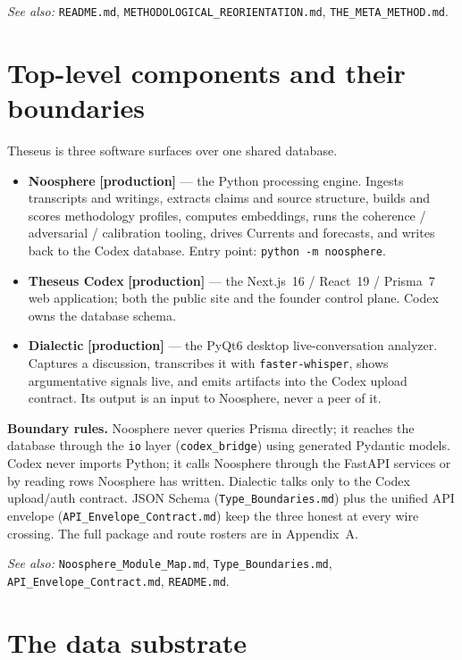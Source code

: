 \documentclass[11pt]{article}
\begin{document}
\textit{See also:} \texttt{README.md}, \texttt{METHODOLOGICAL\_REORIENTATION.md},
\texttt{THE\_META\_METHOD.md}.

\section{Top-level components and their boundaries}

Theseus is three software surfaces over one shared database.

\begin{itemize}[leftmargin=1.4em]
  \item \textbf{Noosphere} \textbf{[production]} --- the Python processing
  engine. Ingests transcripts and writings, extracts claims and source
  structure, builds and scores methodology profiles, computes embeddings, runs
  the coherence / adversarial / calibration tooling, drives Currents and
  forecasts, and writes back to the Codex database. Entry point:
  \texttt{python -m noosphere}.
  \item \textbf{Theseus Codex} \textbf{[production]} --- the Next.js~16 /
  React~19 / Prisma~7 web application; both the public site and the founder
  control plane. Codex owns the database schema.
  \item \textbf{Dialectic} \textbf{[production]} --- the PyQt6 desktop
  live-conversation analyzer. Captures a discussion, transcribes it with
  \texttt{faster-whisper}, shows argumentative signals live, and emits
  artifacts into the Codex upload contract. Its output is an input to
  Noosphere, never a peer of it.
\end{itemize}

\textbf{Boundary rules.} Noosphere never queries Prisma directly; it reaches
the database through the \texttt{io} layer (\texttt{codex\_bridge}) using
generated Pydantic models. Codex never imports Python; it calls Noosphere
through the FastAPI services or by reading rows Noosphere has written.
Dialectic talks only to the Codex upload/auth contract. JSON Schema
(\texttt{Type\_Boundaries.md}) plus the unified API envelope
(\texttt{API\_Envelope\_Contract.md}) keep the three honest at every wire
crossing. The full package and route rosters are in Appendix~A.

\textit{See also:} \texttt{Noosphere\_Module\_Map.md},
\texttt{Type\_Boundaries.md}, \texttt{API\_Envelope\_Contract.md},
\texttt{README.md}.

\section{The data substrate}
\end{document}
